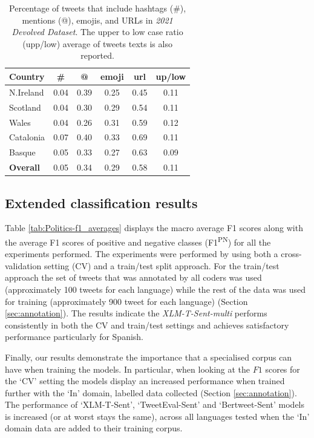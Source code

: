 \begin{table}[ht]
    \centering
    \begin{tabular}{lccccc}
    \textbf{Country} & \textbf{\#} & \textbf{@} & \textbf{emoji} & \textbf{url} & \textbf{up/low} \\ \hline
    N.Ireland               & 0.04        & 0.39       & 0.25           & 0.45         & 0.11            \\ \hline
    Scotland            & 0.04        & 0.30       & 0.29           & 0.54         & 0.11            \\ \hline
    Wales           & 0.04        & 0.26       & 0.31           & 0.59         & 0.12            \\ \hline
    Catalonia           & 0.07        & 0.40       & 0.33           & 0.69         & 0.11            \\ \hline
    Basque           & 0.05        & 0.33      & 0.27           & 0.63         & 0.09            \\ \hline
    \textbf{Overall} & 0.05        & 0.34       & 0.29           & 0.58         & 0.11           
    \end{tabular}
    \caption{Percentage of tweets that include  hashtags (\#), mentions (@), emojis, and URLs in \textit{2021 Devolved Dataset}. The upper to low case ratio (upp/low) average of tweets texts is also reported.}
    \label{tab:Politics-control_stats_devolved}
\end{table}

\subsection{Extended classification results}
Table \ref{tab:Politics-f1_averages} displays the macro average F1 scores along with the average F1 scores of positive and negative classes (F1\textsuperscript{PN}) for all the experiments performed. The experiments were performed by using both a cross-validation setting (CV) and a train/test split approach. For the train/test approach the set of tweets that was annotated by all coders was used (approximately 100 tweets for each language) while the rest of the data was used for training (approximately 900 tweet for each language) (Section \ref{sec:annotation}). The results indicate the \textit{XLM-T-Sent-multi} performs consistently in both the CV and train/test settings and achieves satisfactory performance particularly for Spanish. 

Finally, our results demonstrate the importance that a specialised corpus can have when training the models. In particular, when looking at the $F1$ scores for the `CV' setting the models display an increased performance when trained further with the `In' domain, labelled data collected (Section \ref{sec:annotation}). The performance of `XLM-T-Sent', `TweetEval-Sent' and `Bertweet-Sent' models is increased (or at worst stays the same), across all languages tested when the `In' domain data are added to their training corpus. 

